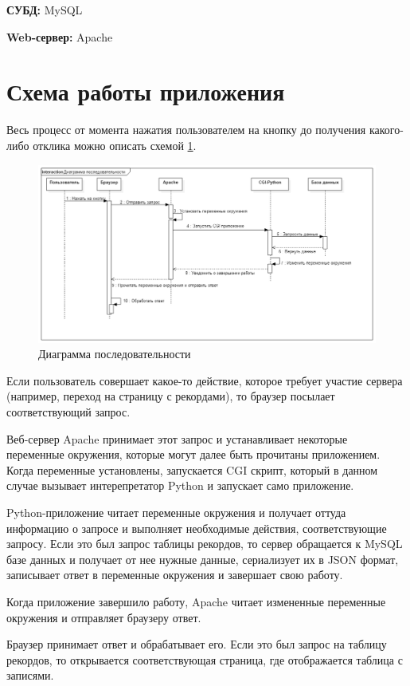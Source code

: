 \documentclass[hidelinks]{article}
\begin{document}
\textbf{СУБД:} MySQL

\textbf{Web-сервер:} Apache

\section{Схема работы приложения}
Весь процесс от момента нажатия пользователем на кнопку до получения какого-либо отклика можно описать схемой \ref{fig:sequence}.


\begin{figure}[H]
    \centering
    \includegraphics[width=\textwidth]{img/sequence.png}
    \caption{Диаграмма последовательности}
    \label{fig:sequence}
\end{figure}

Если пользователь совершает какое-то действие, которое требует участие сервера (например, переход на страницу с рекордами), то браузер посылает соответствующий запрос.

Веб-сервер Apache принимает этот запрос и устанавливает некоторые переменные окружения, которые могут далее быть прочитаны приложением. Когда переменные установлены, запускается CGI скрипт, который в данном случае вызывает интерепретатор Python и запускает само приложение.

Python-приложение читает переменные окружения и получает оттуда информацию о запросе и выполняет необходимые действия, соответствующие запросу. Если это был запрос таблицы рекордов, то сервер обращается к MySQL базе данных и получает от нее нужные данные, сериализует их в JSON формат, записывает ответ в переменные окружения и завершает свою работу.

Когда приложение завершило работу, Apache читает измененные переменные окружения и отправляет браузеру ответ.

Браузер принимает ответ и обрабатывает его. Если это был запрос на таблицу рекордов, то открывается соответствующая страница, где отображается таблица с записями.
\end{document}
